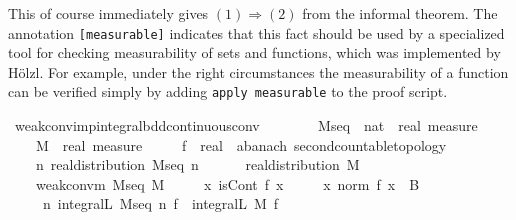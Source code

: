 \documentclass[leqno]{article}
\theoremstyle{definition}
\begin{document}
\medskip

This of course immediately gives $(1) \Longrightarrow (2)$ from the informal theorem. The annotation \texttt{[measurable]} indicates that this fact should be used by a specialized tool for checking measurability of sets and functions, which was implemented by H\"olzl. For example, under the right circumstances the measurability of a function can be verified simply by adding \texttt{apply measurable} to the proof script.

\medskip

\begin{isabellebody}
\isamarkupfalse%
\ weak{\isacharunderscore}conv{\isacharunderscore}imp{\isacharunderscore}integral{\isacharunderscore}bdd{\isacharunderscore}continuous{\isacharunderscore}conv{\isacharcolon}\isanewline
\ \ \ \isanewline
\ \ \ \ M{\isacharunderscore}seq\ {\isacharcolon}{\isacharcolon}\ {\isachardoublequoteopen}nat\ {\isasymRightarrow}\ real\ measure{\isachardoublequoteclose}\ \isanewline
\ \ \ \ M\ {\isacharcolon}{\isacharcolon}\ {\isachardoublequoteopen}real\ measure{\isachardoublequoteclose}\ \isanewline
\ \ \ \ f\ {\isacharcolon}{\isacharcolon}\ {\isachardoublequoteopen}real\ {\isasymRightarrow}\ {\isacharprime}a{\isacharcolon}{\isacharcolon}{\isacharbraceleft}banach{\isacharcomma}\ second{\isacharunderscore}countable{\isacharunderscore}topology{\isacharbraceright}{\isachardoublequoteclose}\isanewline
\ \ \ \isanewline
\ \ \ \ {\isachardoublequoteopen}{\isasymAnd}n{\isachardot}\ real{\isacharunderscore}distribution\ {\isacharparenleft}M{\isacharunderscore}seq\ n{\isacharparenright}{\isachardoublequoteclose}\ \ \isanewline
\ \ \ \ {\isachardoublequoteopen}real{\isacharunderscore}distribution\ M{\isachardoublequoteclose}\ \ \isanewline
\ \ \ \ {\isachardoublequoteopen}weak{\isacharunderscore}conv{\isacharunderscore}m\ M{\isacharunderscore}seq\ M{\isachardoublequoteclose}\ \isanewline
\ \ \ \ {\isachardoublequoteopen}{\isasymAnd}x{\isachardot}\ isCont\ f\ x{\isachardoublequoteclose}\ \isanewline
\ \ \ \ {\isachardoublequoteopen}{\isasymAnd}x{\isachardot}\ norm\ {\isacharparenleft}f\ x{\isacharparenright}\ {\isasymle}\ B{\isachardoublequoteclose}\isanewline
\ \ \ \isanewline
\ \ \ \ {\isachardoublequoteopen}{\isacharparenleft}{\isasymlambda}\ n{\isachardot}\ integral\isactrlsup L\ {\isacharparenleft}M{\isacharunderscore}seq\ n{\isacharparenright}\ f{\isacharparenright}\ {\isacharminus}{\isacharminus}{\isacharminus}{\isacharminus}{\isachargreater}\ integral\isactrlsup L\ M\ f{\isachardoublequoteclose}\isanewline

\end{isabellebody}
\end{document}
